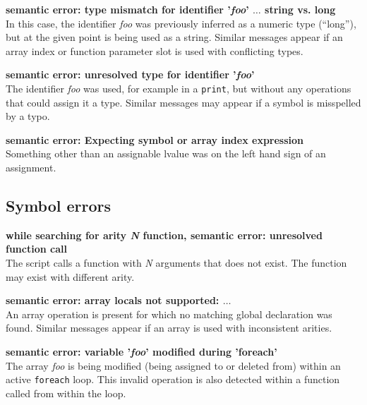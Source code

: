 \documentclass{article}
\begin{document}
\begin{description}
\item{\bf semantic error: type mismatch for identifier '{\em foo}'
$\ldots$ string vs. long} \\ In this case, the identifier {\em foo}
was previously inferred as a numeric type (``long''), but at the given
point is being used as a string.  Similar messages appear if an array
index or function parameter slot is used with conflicting types.

\item{\bf semantic error: unresolved type for identifier '{\em foo}'}
\\ The identifier {\em foo} was used, for example in a \verb+print+,
but without any operations that could assign it a type.  Similar
messages may appear if a symbol is misspelled by a typo.

\item{\bf semantic error: Expecting symbol or array index expression}
\\ Something other than an assignable lvalue was on the left hand sign
of an assignment.
\end{description}

\subsection{Symbol errors}

\begin{description}
\item{\bf while searching for arity {\em N} function, semantic error:
unresolved function call} \\ The script calls a function with {\em N}
arguments that does not exist.  The function may exist with different
arity.

\item{\bf semantic error: array locals not supported: $\ldots$} \\ An
array operation is present for which no matching global declaration
was found.  Similar messages appear if an array is used with
inconsistent arities.

\item{\bf semantic error: variable '{\em foo}' modified during 'foreach'} \\
The array {\em foo} is being modified (being assigned to or deleted from)
within an active \verb+foreach+ loop.  This invalid operation is also
detected within a function called from within the loop. 
\end{description}
\end{document}
